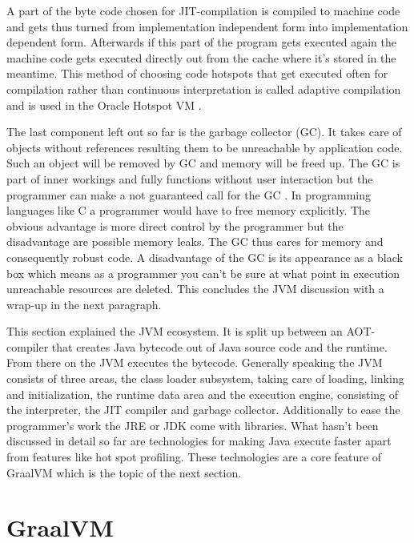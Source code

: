 A part of the byte code chosen for JIT-compilation is compiled to machine code and gets thus turned from implementation independent form into implementation dependent form. Afterwards if this part of the program gets executed again the machine code gets executed directly out from the cache where it's stored in the meantime. This method of choosing code hotspots that get executed often for compilation rather than continuous interpretation is called adaptive compilation and is used in the Oracle Hotspot VM \cite{Lindholm, graalVMIntro}.

The last component left out so far is the garbage collector (GC). It takes care of objects without references resulting them to be unreachable by application code. Such an object will be removed by GC and memory will be freed up. The GC is part of inner workings and fully functions without user interaction but the programmer can make a not guaranteed call for the GC \cite{Lindholm}. In programming languages like C a programmer would have to free memory explicitly. The obvious advantage is more direct control by the programmer but the disadvantage are possible memory leaks. The GC thus cares for memory and consequently robust code. A disadvantage of the GC is its appearance as a black box which means as a programmer you can't be sure at what point in execution unreachable resources are deleted. This concludes the JVM discussion with a wrap-up in the next paragraph.

This section explained the JVM ecosystem. It is split up between an AOT-compiler that creates Java bytecode out of Java source code and the runtime. From there on the JVM executes the bytecode. Generally speaking the JVM consists of three areas, the class loader subsystem, taking care of loading, linking and initialization, the runtime data area and the execution engine, consisting of the interpreter, the JIT compiler and garbage collector. Additionally to ease the programmer's work the JRE or JDK come with libraries. What hasn't been discussed in detail so far are technologies for making Java execute faster apart from features like hot spot profiling. These technologies are a core feature of GraalVM which is the topic of the next section.

\section{GraalVM}

